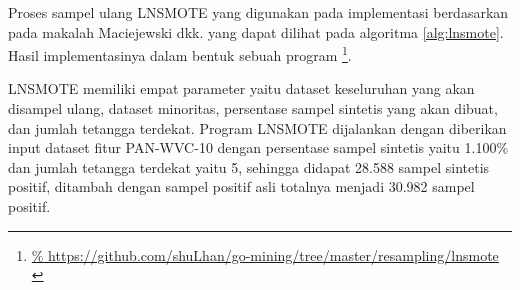 Proses sampel ulang LNSMOTE yang digunakan pada implementasi berdasarkan
pada makalah Maciejewski dkk.
\cite{maciejewski2011local}
yang dapat dilihat pada algoritma
\ref{alg:lnsmote}.
Hasil implementasinya dalam bentuk sebuah program
\footnote{\url{%
https://github.com/shuLhan/go-mining/tree/master/resampling/lnsmote
}}.

LNSMOTE memiliki empat parameter yaitu dataset keseluruhan yang akan disampel
ulang, dataset minoritas, persentase sampel sintetis yang akan dibuat, dan
jumlah tetangga terdekat.
Program LNSMOTE dijalankan dengan diberikan input dataset fitur PAN-WVC-10
dengan persentase sampel sintetis yaitu 1.100\% dan jumlah tetangga terdekat
yaitu 5, sehingga didapat 28.588 sampel sintetis positif, ditambah dengan
sampel positif asli totalnya menjadi 30.982 sampel positif.
